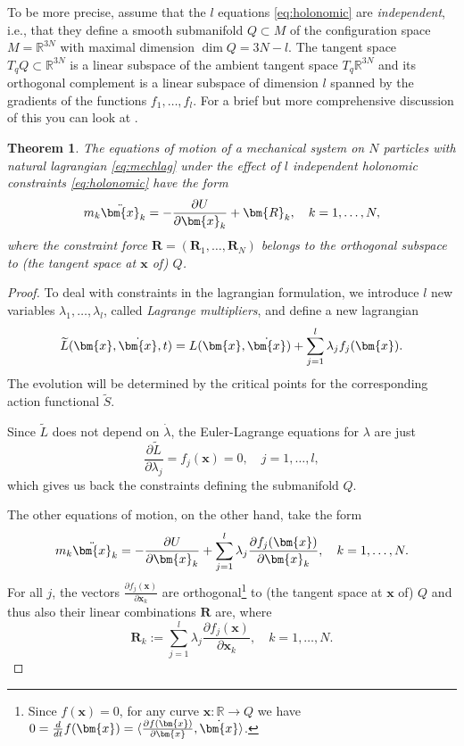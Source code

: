 \documentclass[english,fontsize=11pt,paper=a5,oneside]{scrbook}
\newcommand{\R}{\mathbb{R}}
\newcommand{\bx}{\bm{x}}
\newcommand{\lag}{\langle}
\newcommand{\rag}{\rangle}
\newtheorem{theorem}{Theorem}[chapter]
\theoremstyle{definition}
\begin{document}
To be more precise, assume that the $l$ equations \eqref{eq:holonomic} are \emph{independent}, i.e., that they define a smooth submanifold $Q\subset M$ of the configuration space $M=\R^{3N}$ with maximal dimension $\dim Q = 3N-l$.
The tangent space $T_qQ \subset \R^{3N}$ is a linear subspace of the ambient tangent space $T_q \R^{3N}$ and its orthogonal complement is a linear subspace of dimension $l$ spanned by the gradients of the functions $f_1, \ldots, f_l$.
For a brief but more comprehensive discussion of this you can look at \cite[Chapter 2.8]{lectures:aom:seri}.

\begin{theorem}
  The equations of motion of a mechanical system on $N$ particles with natural lagrangian \eqref{eq:mechlag} under the effect of $l$ independent holonomic constraints \eqref{eq:holonomic} have the form
  \begin{equation}\label{eq:generalnewtonconstraint}
    m_k \ddot \bx_k = - \frac{\partial U}{\partial \bx_k} + \bm{R}_k, \quad k=1, \ldots, N,
  \end{equation}
  where the \emph{constraint force} $\bm{R} = (\bm{R}_1, \ldots, \bm{R}_N)$ belongs to the orthogonal subspace to (the tangent space at $\bx$ of) $Q$.
\end{theorem}
\begin{proof}
  To deal with constraints in the lagrangian formulation, we introduce $l$ new variables $\lambda_1, \ldots, \lambda_l$, called \emph{Lagrange multipliers}, and define a new lagrangian
  \begin{equation}
    \widetilde L(\bx, \dot\bx, t) = L(\bx, \dot\bx) + \sum_{j=1}^l \lambda_j f_j(\bx).
  \end{equation}
  The evolution will be determined by the critical points for the corresponding action functional $\widetilde S$.

  Since $\widetilde L$ does not depend on $\dot\lambda$, the Euler-Lagrange equations for $\lambda$ are just
  \begin{equation}
    \frac{\partial \widetilde L}{\partial \lambda_j} = f_j(\bx) = 0,\quad j=1,\ldots,l,
  \end{equation}
  which gives us back the constraints defining the submanifold $Q$.

  The other equations of motion, on the other hand, take the form
  \begin{equation}\label{eq:newtconstr}
    m_k \ddot \bx_k = -\frac{\partial U}{\partial\bx_k} + \sum_{j=1}^l \lambda_j \frac{\partial f_j(\bx)}{\partial \bx_k},
    \quad k=1,\ldots,N.
  \end{equation}
  For all $j$, the vectors $\frac{\partial f_j(\bx)}{\partial \bx_k}$ are orthogonal\footnote{Since $f(\bx) = 0$, for any curve $\bx:\R\to Q$ we have $0 = \frac{d}{dt} f(\bx) = \lag \frac{\partial f(\bx)}{\partial \bx}, \dot\bx \rag$.} to (the tangent space at $\bx$ of) $Q$ and thus also their linear combinations $\bm{R}$ are, where
  \begin{equation}
    \bm{R}_k := \sum_{j=1}^l \lambda_j \frac{\partial f_j(\bx)}{\partial \bx_k},
    \quad k=1,\ldots,N.
  \end{equation}
\end{proof}
\end{document}
